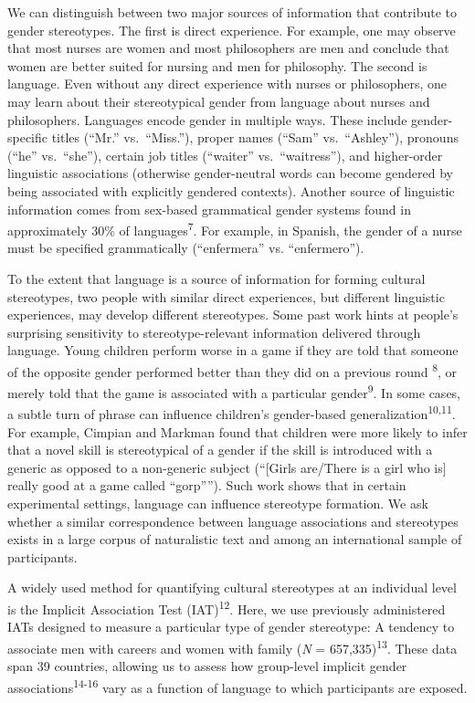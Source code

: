 \documentclass[11pt]{wlscirep}
\begin{document}
We can distinguish between two major sources of information that contribute to gender stereotypes. The first is direct experience. For
example, one may observe that most nurses are women and most
philosophers are men and conclude that women are better suited for
nursing and men for philosophy. The second is language. Even without any
direct experience with nurses or philosophers, one may learn about their
stereotypical gender from language about nurses and philosophers.
Languages encode gender in multiple ways. These include gender-specific
titles (\enquote{Mr.} vs.\ \enquote{Miss.}), proper names (\enquote{Sam}
vs.\ \enquote{Ashley}), pronouns (\enquote{he} vs.\ \enquote{she}),
certain job titles (\enquote{waiter} vs.\ \enquote{waitress}), and
higher-order linguistic associations (otherwise gender-neutral words can
become gendered by being associated with explicitly gendered contexts).
Another source of linguistic information comes from sex-based
grammatical gender systems found in approximately 30\% of languages\textsuperscript{7}. For example, in Spanish, the gender of a
nurse must be specified grammatically (\enquote{enfermera} vs.
\enquote{enfermero}).

To the extent that language is a source of information for forming
cultural stereotypes, two people with similar direct experiences, but
different linguistic experiences, may develop different stereotypes.
Some past work hints at people's surprising sensitivity to
stereotype-relevant information delivered through language. Young
children perform worse in a game if they are told that someone of the
opposite gender performed better than they did on a previous round
\textsuperscript{8}, or merely told that the game is associated
with a particular gender\textsuperscript{9}. In some
cases, a subtle turn of phrase can influence children's gender-based
generalization\textsuperscript{10,11}. For example, Cimpian and Markman found that children were more likely to infer that a novel skill is stereotypical of a
gender if the skill is introduced with a generic as opposed to a
non-generic subject (``{[}Girls are/There is a girl who is{]} really
good at a game called ``gorp''''). Such work shows that in certain
experimental settings, language can influence stereotype formation. We ask whether a similar correspondence between language associations and stereotypes exists in a large corpus of naturalistic text and among an international sample of participants.

A widely used method for quantifying cultural stereotypes at an
individual level is the Implicit Association Test (IAT)\textsuperscript{12}. Here, we use previously administered IATs designed to measure a particular type of gender
stereotype: A tendency to associate men with careers and women with family
(\emph{N} = 657,335)\textsuperscript{13}. These data span 39 countries, allowing us to assess how group-level implicit gender associations\textsuperscript{14-16} vary as a function of language to which participants are exposed.
\end{document}
